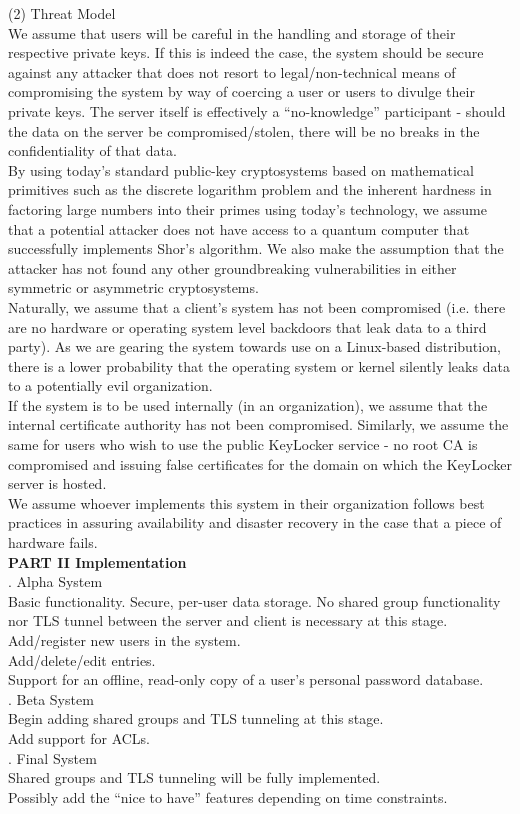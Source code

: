 \documentclass[11pt, letterpaper]{article}
\newcommand{\DesignSection}[1]
{\noindent\textbf{#1}\\}
\newcommand{\IndentBullet}[1]
{\indent\textbullet{} #1\\}
\begin{document}
\bigskip
\noindent(2) Threat Model\\
\IndentBullet{We assume that users will be careful in the handling and storage of their respective private keys. If this is indeed the case, the system should be secure against any attacker that does not resort to legal/non-technical means of compromising the system by way of coercing a user or users to divulge their private keys. The server itself is effectively a “no-knowledge” participant - should the data on the server be compromised/stolen, there will be no breaks in the confidentiality of that data.}
\IndentBullet{By using today’s standard public-key cryptosystems based on mathematical primitives such as the discrete logarithm problem and the inherent hardness in factoring large numbers into their primes using today’s technology, we assume that a potential attacker does not have access to a quantum computer that successfully implements Shor’s algorithm. We also make the assumption that the attacker has not found any other groundbreaking vulnerabilities in either symmetric or asymmetric cryptosystems.}
\IndentBullet{Naturally, we assume that a client’s system has not been compromised (i.e. there are no hardware or operating system level backdoors that leak data to a third party). As we are gearing the system towards use on a Linux-based distribution, there is a lower probability that the operating system or kernel silently leaks data to a potentially evil organization.}
\IndentBullet{If the system is to be used internally (in an organization), we assume that the internal certificate authority has not been compromised. Similarly, we assume the same for users who wish to use the public KeyLocker service - no root CA is compromised and issuing false certificates for the domain on which the KeyLocker server is hosted.}
\IndentBullet{We assume whoever implements this system in their organization follows best practices in assuring availability and disaster recovery in the case that a piece of hardware fails.}

\bigskip
\DesignSection{PART II Implementation}
. Alpha System\\
\IndentBullet{Basic functionality. Secure, per-user data storage. No shared group functionality nor TLS tunnel between the server and client is necessary at this stage.}
\IndentBullet{Add/register new users in the system.}
\IndentBullet{Add/delete/edit entries.}
\IndentBullet{Support for an offline, read-only copy of a user’s personal password database.}
. Beta System\\
\IndentBullet{Begin adding shared groups and TLS tunneling at this stage.}
\IndentBullet{Add support for ACLs.}
. Final System\\
\IndentBullet{Shared groups and TLS tunneling will be fully implemented.}
\IndentBullet{Possibly add the “nice to have” features depending on time constraints.}
\end{document}
